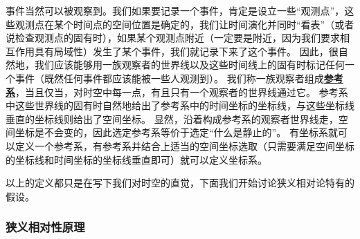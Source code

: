 \documentclass[hyperref, UTF8, a4paper]{ctexart}
\newcommand*{\concept}[1]{\underline{\textbf{#1}}}
\begin{document}
事件当然可以被观察到。我们如果要记录一个事件，肯定是设立一些“观测点”，这些观测点在某个时间点的空间位置是确定的，我们让时间演化并同时“看表”（或者说检查观测点的固有时），如果某个观测点附近（一定要是附近，因为我们要求相互作用具有局域性）发生了某个事件，我们就记录下来了这个事件。
因此，很自然地，我们应该能够用一族观察者的世界线以及这些时间线上的固有时标记任何一个事件（既然任何事件都应该能被一些人观测到）。
我们称一族观察者组成\concept{参考系}，当且仅当，对时空中每一点，有且只有一个观察者的世界线通过它。
参考系中这些世界线的固有时自然地给出了参考系中的时间坐标的坐标线，与这些坐标线垂直的坐标线则给出了空间坐标。
显然，沿着构成参考系的观察者世界线走，空间坐标是不会变的，因此选定参考系等价于选定“什么是静止的”。
有坐标系就可以定义一个参考系，有参考系并结合上适当的空间坐标选取（只需要满足空间坐标的坐标线和时间坐标的坐标线垂直即可）就可以定义坐标系。

以上的定义都只是在写下我们对时空的直觉，下面我们开始讨论狭义相对论特有的假设。

\subsubsection{狭义相对性原理}\label{sec:principle-special-relativity}
\end{document}
